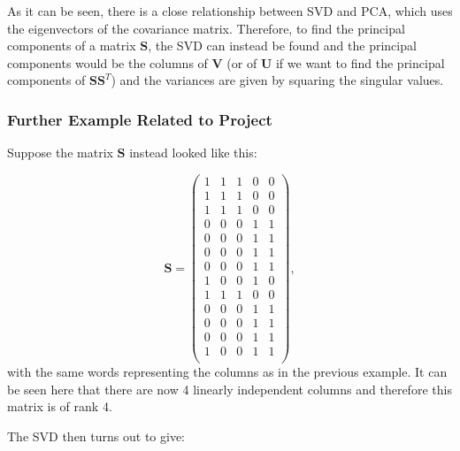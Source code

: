 \documentclass[11pt,a4paper]{article}
\begin{document}
As it can be seen, there is a close relationship between SVD and PCA, which uses the eigenvectors of the covariance matrix. Therefore, to find the principal components of a matrix $\mathbf{S}$, the SVD can instead be found and the principal components would be the columns of $\mathbf{V}$ (or of $\mathbf{U}$ if we want to find the principal components of $\mathbf{S}\mathbf{S}^T$) and the variances are given by squaring the singular values.

\subsubsection{Further Example Related to Project}
Suppose the matrix $\mathbf{S}$ instead looked like this:

\begin{equation}
\mathbf{S} = 
\begin{pmatrix}
1 & 1 & 1 & 0 & 0\\
1 & 1 & 1 & 0 & 0\\
1 & 1 & 1 & 0 & 0\\
0 & 0 & 0 & 1 & 1\\
0 & 0 & 0 & 1 & 1\\
0 & 0 & 0 & 1 & 1\\
0 & 0 & 0 & 1 & 1\\
1 & 0 & 0 & 1 & 0\\
1 & 1 & 1 & 0 & 0\\
0 & 0 & 0 & 1 & 1\\
0 & 0 & 0 & 1 & 1\\
0 & 0 & 0 & 1 & 1\\
1 & 0 & 0 & 1 & 1\\
\end{pmatrix},
\end{equation}
with the same words representing the columns as in the previous example. It can be seen here that there are now 4 linearly independent columns and therefore this matrix is of rank 4. 

The SVD then turns out to give:
\end{document}
